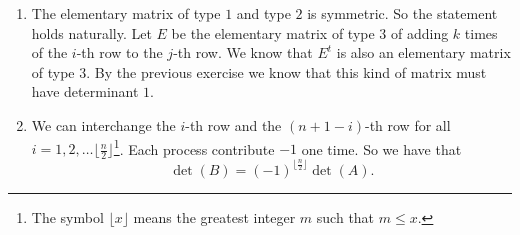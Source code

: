 \begin{enumerate}
\item The elementary matrix of type $1$ and type $2$ is symmetric. So the statement holds naturally. Let $E$ be the elementary matrix of type $3$ of adding $k$ times of the $i$-th row to the $j$-th row. We know that $E^t$ is also an elementary matrix of type $3$. By the previous exercise we know that this kind of matrix must have determinant $1$.
\item We can interchange the $i$-th row and the $(n+1-i)$-th row for all $i=1,2,\ldots \lfloor \frac{n}{2}\rfloor$\footnote{The symbol $\lfloor x\rfloor$ means the greatest integer $m$ such that $m\leq x$.}. Each process contribute $-1$ one time. So we have that 
\[\det(B)=(-1)^{\lfloor \frac{n}{2}\rfloor}\det(A).\]
\end{enumerate}
